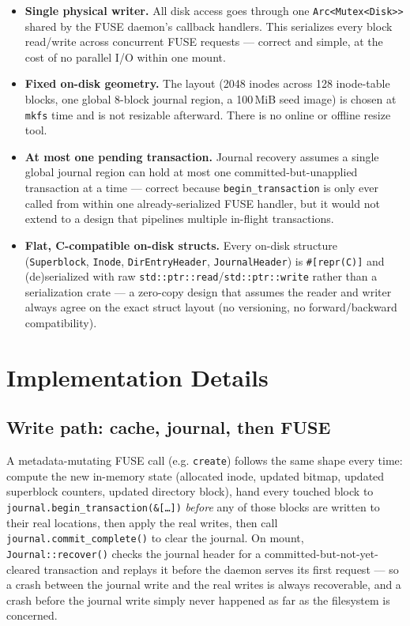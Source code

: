 \documentclass[11pt]{article}
\begin{document}
\begin{itemize}
    \item \textbf{Single physical writer.} All disk access goes through one \texttt{Arc<Mutex<Disk>>}
    shared by the FUSE daemon's callback handlers. This serializes every block read/write across
    concurrent FUSE requests — correct and simple, at the cost of no parallel I/O within one mount.
    \item \textbf{Fixed on-disk geometry.} The layout (2048 inodes across 128 inode-table blocks, one
    global 8-block journal region, a 100\,MiB seed image) is chosen at \texttt{mkfs} time and is not
    resizable afterward. There is no online or offline resize tool.
    \item \textbf{At most one pending transaction.} Journal recovery assumes a single global journal
    region can hold at most one committed-but-unapplied transaction at a time — correct because
    \texttt{begin\_transaction} is only ever called from within one already-serialized FUSE handler, but
    it would not extend to a design that pipelines multiple in-flight transactions.
    \item \textbf{Flat, C-compatible on-disk structs.} Every on-disk structure (\texttt{Superblock},
    \texttt{Inode}, \texttt{DirEntryHeader}, \texttt{JournalHeader}) is \texttt{\#[repr(C)]} and
    (de)serialized with raw \texttt{std::ptr::read}/\texttt{std::ptr::write} rather than a serialization
    crate — a zero-copy design that assumes the reader and writer always agree on the exact struct layout
    (no versioning, no forward/backward compatibility).
\end{itemize}

\section{Implementation Details}

\subsection{Write path: cache, journal, then FUSE}

A metadata-mutating FUSE call (e.g. \texttt{create}) follows the same shape every time: compute the
new in-memory state (allocated inode, updated bitmap, updated superblock counters, updated directory
block), hand every touched block to \texttt{journal.begin\_transaction(\&[\ldots])} \emph{before} any
of those blocks are written to their real locations, then apply the real writes, then call
\texttt{journal.commit\_complete()} to clear the journal. On mount, \texttt{Journal::recover()} checks
the journal header for a committed-but-not-yet-cleared transaction and replays it before the daemon
serves its first request — so a crash between the journal write and the real writes is always
recoverable, and a crash before the journal write simply never happened as far as the filesystem is
concerned.
\end{document}
